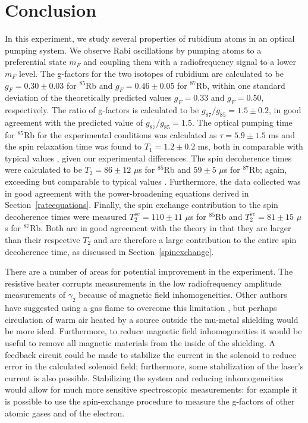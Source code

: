 
\section{Conclusion}\label{conclusion}

In this experiment, we study several properties of rubidium atoms in an optical pumping system. We observe Rabi oscillations by pumping atoms to a preferential state $m_{F}$ and coupling them with a radiofrequency signal to a lower $m_{F}$ level. The g-factors for the two isotopes of rubidium are calculated to be $g_{F}=0.30\pm0.03$ for $^{85}$Rb and $g_{F}=0.46\pm0.05$ for $^{87}$Rb, within one standard deviation of the theoretically predicted values $g_{F}=0.33$ and $g_{F}=0.50$, respectively. The ratio of g-factors is calculated to be $g_{87}/g_{85}=1.5\pm0.2$, in good agreement with the predicted value of $g_{87}/g_{85}=1.5$. The optical pumping time for $^{85}$Rb for the experimental conditions was calculated as $\tau = 5.9\pm 1.5$ ms and the spin relaxation time was found to $T_{1}=1.2 \pm 0.2$ ms, both in comparable with typical values \cite{vanier}, given our experimental differences. The spin decoherence times were calculated to be $T_2 = 86 \pm 12$ $\mu$s for $^{85}$Rb and $59 \pm 5$ $\mu$s for $^{87}$Rb; again, exceeding but comparable to typical values \cite{vanier}. Furthermore, the data collected was in good agreement with the power-broadening equations derived in Section~\ref{rateequations}. Finally, the spin exchange contribution to the spin decoherence times were measured $T^{se}_2=110 \pm 11$ $\mu$s for  $^{85}$Rb and $T^{se}_2 = 81 \pm 15$ $\mu$s for  $^{87}$Rb. Both are in good agreement with the theory in that they are larger than their respective $T_{2}$ and are therefore a large contribution to the entire spin decoherence time, as discussed in Section~\ref{spinexchange}.

There are a number of areas for potential improvement in the experiment. The resistive heater corrupts measurements in the low radiofrequency amplitude measurements of $\gamma_{2}$ because of magnetic field inhomogeneities. Other authors have suggested using a gas flame to overcome this limitation \cite{benumof}, but perhaps circulation of warm air heated by a source outside the mu-metal shielding would be more ideal. Furthermore, to reduce magnetic field inhomogeneities it would be useful to remove all magnetic materials from the inside of the shielding. A feedback circuit could be made to stabilize the current in the solenoid to reduce error in the calculated solenoid field; furthermore, some stabilization of the laser's current is also possible. Stabilizing the system and reducing inhomogeneities would allow for much more sensitive spectroscopic measurements: for example it is possible to use the spin-exchange procedure to measure the g-factors of other atomic gases and of the electron.